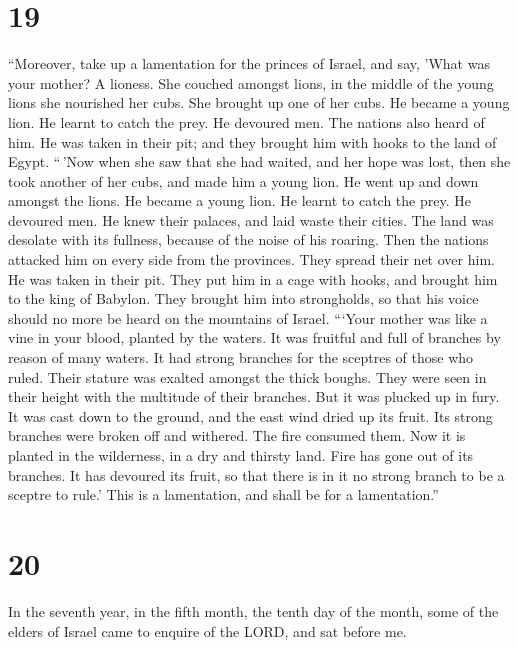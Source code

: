 \hypertarget{section-17}{%
\section{19}\label{section-17}}

 ``Moreover, take up a lamentation for the princes of
Israel,  and say, 'What was your mother? A lioness. She
couched amongst lions, in the middle of the young lions she nourished
her cubs.  She brought up one of her cubs. He became a
young lion. He learnt to catch the prey. He devoured men. 
The nations also heard of him. He was taken in their pit; and they
brought him with hooks to the land of Egypt.  ``\,'Now
when she saw that she had waited, and her hope was lost, then she took
another of her cubs, and made him a young lion.  He went
up and down amongst the lions. He became a young lion. He learnt to
catch the prey. He devoured men.  He knew their palaces,
and laid waste their cities. The land was desolate with its fullness,
because of the noise of his roaring.  Then the nations
attacked him on every side from the provinces. They spread their net
over him. He was taken in their pit.  They put him in a
cage with hooks, and brought him to the king of Babylon. They brought
him into strongholds, so that his voice should no more be heard on the
mountains of Israel.  ```Your mother was like a vine in
your blood, planted by the waters. It was fruitful and full of branches
by reason of many waters.  It had strong branches for the
sceptres of those who ruled. Their stature was exalted amongst the thick
boughs. They were seen in their height with the multitude of their
branches.  But it was plucked up in fury. It was cast
down to the ground, and the east wind dried up its fruit. Its strong
branches were broken off and withered. The fire consumed them.
 Now it is planted in the wilderness, in a dry and
thirsty land.  Fire has gone out of its branches. It has
devoured its fruit, so that there is in it no strong branch to be a
sceptre to rule.' This is a lamentation, and shall be for a
lamentation.''

\hypertarget{section-18}{%
\section{20}\label{section-18}}

 In the seventh year, in the fifth month, the tenth day of
the month, some of the elders of Israel came to enquire of the LORD, and
sat before me.

